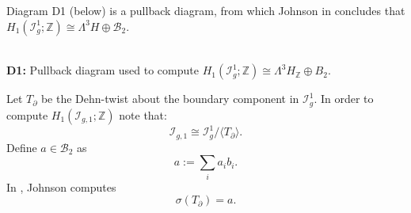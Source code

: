 \documentclass[a4paper]{amsproc}
\theoremstyle{TheoremNum}
\theoremstyle{Theorembold}
\theoremstyle{TheoremboldDef}
\theoremstyle{TheoremboldRem}
\theoremstyle{TheoremboldRem}
\begin{document}
Diagram D1 (below) is a pullback diagram, from which Johnson in \cite{johnsonstructure3} concludes that $H_1({{\mathcal{I}}_{g}^{1}};{\mathbb{Z}})\cong \Lambda^3H\oplus \mathcal{B}_2$.
\begin{center}
\\
\textbf{D1:} Pullback diagram used to compute $H_1({{\mathcal{I}}_{g}^{1}};{\mathbb{Z}})\cong \Lambda^3H_{\mathbb{Z}}\oplus B_2$.\\

\end{center}

Let $T_\partial$ be the Dehn-twist about the boundary component in ${{\mathcal{I}}_{g}^{1}}$.  In order to compute $H_1({{\mathcal{I}}_{g,1}};{\mathbb{Z}})$ note that: \[{{\mathcal{I}}_{g,1}}\cong{{\mathcal{I}}_{g}^{1}}/\langle T_\partial\rangle .\]   
Define $a\in\mathcal{B}_2$ as \[a:=\sum_i a_ib_i.\] In \cite{johnsonstructure3}, Johnson computes \[\sigma(T_\partial)=a.\] 
\end{document}

